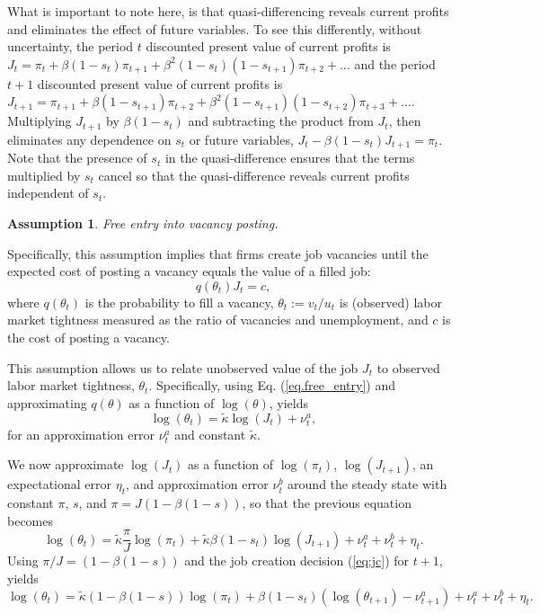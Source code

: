 \documentclass[12pt]{article}
\newcommand{\1}{\mathbf{1}}
\newtheorem{assumption}{Assumption}
\begin{document}
What is important to note here, is that quasi-differencing reveals current profits and eliminates the effect of future variables. To see this differently, without uncertainty, the period $t$ discounted present value of current profits is 
$J_t =  \pi_t + \beta(1-s_t) \pi_{t+1} + \beta^2 (1-s_t) (1-s_{t+1})  \pi_{t+2} + \ldots$ 
 and the period $t+1$ discounted present value of current profits is 
$J_{t+1} =  \pi_{t+1} + \beta(1-s_{t+1}) \pi_{t+2} + \beta^2 (1-s_{t+1}) (1-s_{t+2})  \pi_{t+3} + \ldots$.
Multiplying $J_{t+1}$ by $\beta(1-s_t)$ and subtracting the product from $J_t$, then eliminates any dependence on $s_t$ or future variables, $J_t - \beta(1-s_t) J_{t+1} = \pi_t $. Note that the presence of $s_t$ in the quasi-difference ensures that the terms multiplied by $s_t$ cancel so that the quasi-difference reveals current profits independent of $s_t$.

\begin{assumption}\label{ass:free_entry}
    Free entry into vacancy posting. 
\end{assumption}
Specifically, this assumption implies that firms create job vacancies until the expected cost of posting a vacancy equals the value of a filled job:
\begin{equation}\label{eq.free_entry}
q(\theta_t) J_t=c,
\end{equation}
where $q(\theta_t)$ is the probability to fill a vacancy, $\theta_t:=v_t/u_t$ is (observed) labor market tightness measured as the ratio of vacancies and unemployment, and $c$ is the cost of posting a vacancy. 

This assumption allows us to relate unobserved value of the job $J_t$ to observed labor market tightness, $\theta_t$. Specifically, using Eq. (\ref{eq.free_entry}) and approximating $q(\theta)$ as a function of $\log(\theta)$, yields
\begin{equation}\label{eq:jc}
\log(\theta_t)=\tilde{\kappa} \log(J_t) + \nu^a_t,
\end{equation}
for an approximation error $\nu^a_t$ and constant $\tilde{\kappa}$.

We now approximate $\log(J_t)$ as a function of $\log(\pi_t)$, $\log(J_{t+1})$, an expectational error $\eta_t$, and approximation error $\nu^b_t$ around the steady state with constant $\pi$, $s$, and $\pi = J (1-\beta (1-s))$, so that the previous equation becomes
\begin{equation}
\log(\theta_t)=\tilde{\kappa} \frac{\pi}{J} \log(\pi_{t}) + \tilde{\kappa} \beta (1-s_t) \log(J_{t+1}) + \nu^a_t + \nu^b_t + \eta_t.
\end{equation}
Using $\pi / J = (1-\beta (1-s))$ and the job creation decision (\ref{eq:jc}) for $t+1$, yields
\begin{equation}
\log(\theta_t)=\tilde{\kappa}  (1-\beta (1-s)) \log(\pi_{t}) + \beta (1-s_t) (\log(\theta_{t+1}) - \nu^a_{t+1})+ \nu^a_t + \nu^b_t + \eta_t.
\end{equation}
\end{document}
